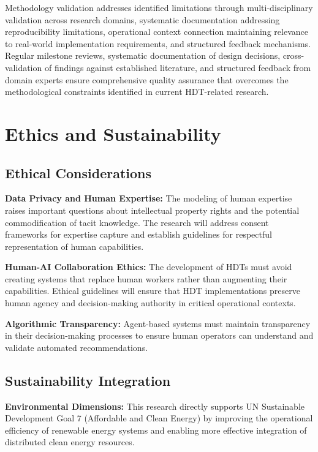 \documentclass[12pt,a4paper]{article}
\begin{document}
Methodology validation addresses identified limitations through multi-disciplinary validation across research domains, systematic documentation addressing reproducibility limitations, operational context connection maintaining relevance to real-world implementation requirements, and structured feedback mechanisms. Regular milestone reviews, systematic documentation of design decisions, cross-validation of findings against established literature, and structured feedback from domain experts ensure comprehensive quality assurance that overcomes the methodological constraints identified in current HDT-related research.

\section{Ethics and Sustainability}
\label{sec:ethics}

\subsection{Ethical Considerations}

\textbf{Data Privacy and Human Expertise:} The modeling of human expertise raises important questions about intellectual property rights and the potential commodification of tacit knowledge. The research will address consent frameworks for expertise capture and establish guidelines for respectful representation of human capabilities.

\textbf{Human-AI Collaboration Ethics:} The development of HDTs must avoid creating systems that replace human workers rather than augmenting their capabilities. Ethical guidelines will ensure that HDT implementations preserve human agency and decision-making authority in critical operational contexts.

\textbf{Algorithmic Transparency:} Agent-based systems must maintain transparency in their decision-making processes to ensure human operators can understand and validate automated recommendations.

\subsection{Sustainability Integration}

\textbf{Environmental Dimensions:} This research directly supports UN Sustainable Development Goal 7 (Affordable and Clean Energy) by improving the operational efficiency of renewable energy systems and enabling more effective integration of distributed clean energy resources.
\end{document}
